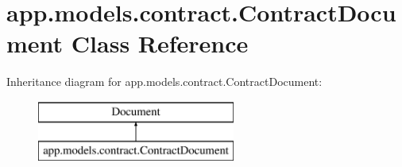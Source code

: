 \hypertarget{classapp_1_1models_1_1contract_1_1_contract_document}{}\section{app.\+models.\+contract.\+Contract\+Document Class Reference}
\label{classapp_1_1models_1_1contract_1_1_contract_document}
Inheritance diagram for app.\+models.\+contract.\+Contract\+Document\+:\begin{figure}[H]
\begin{center}
\leavevmode
\includegraphics[height=2.000000cm]{classapp_1_1models_1_1contract_1_1_contract_document}
\end{center}
\end{figure}
